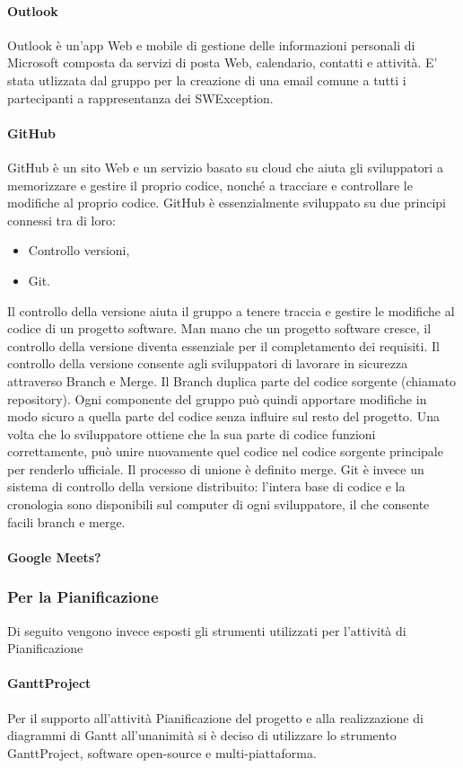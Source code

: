 \paragraph{Outlook}
Outlook è un'app Web e mobile di gestione delle informazioni personali di Microsoft composta da servizi di posta Web, calendario, contatti e attività. E' stata utlizzata dal gruppo per la creazione di una email comune a tutti i partecipanti a rappresentanza dei SWException. 

\paragraph{GitHub}
GitHub è un sito Web e un servizio basato su cloud che aiuta gli sviluppatori a memorizzare e gestire il proprio codice, nonché a tracciare e controllare le modifiche al proprio codice. GitHub è essenzialmente sviluppato su due principi connessi tra di loro:
\begin{itemize}
\item Controllo versioni,
\item Git.
\end{itemize}
Il controllo della versione aiuta il gruppo a tenere traccia e gestire le modifiche al codice di un progetto software. Man mano che un progetto software cresce, il controllo della versione diventa essenziale per il completamento dei requisiti. Il controllo della versione consente agli sviluppatori di lavorare in sicurezza attraverso Branch e Merge. Il Branch duplica parte del codice sorgente (chiamato repository). Ogni componente del gruppo può quindi apportare modifiche in modo sicuro a quella parte del codice senza influire sul resto del progetto. Una volta che lo sviluppatore ottiene che la sua parte di codice funzioni correttamente, può unire nuovamente quel codice nel codice sorgente principale per renderlo ufficiale. Il processo di unione è definito merge.
Git è invece un sistema di controllo della versione distribuito: l'intera base di codice e la cronologia sono disponibili sul computer di ogni sviluppatore, il che consente facili branch e merge. 

\paragraph{Google Meets?}

\subsubsection{Per la Pianificazione}
Di seguito vengono invece esposti gli strumenti utilizzati per l’attività di Pianificazione
\paragraph{GanttProject}
Per il supporto all’attività Pianificazione del progetto e alla realizzazione di diagrammi di Gantt all’unanimità si è deciso di utilizzare lo strumento GanttProject, software open-source e multi-piattaforma.

